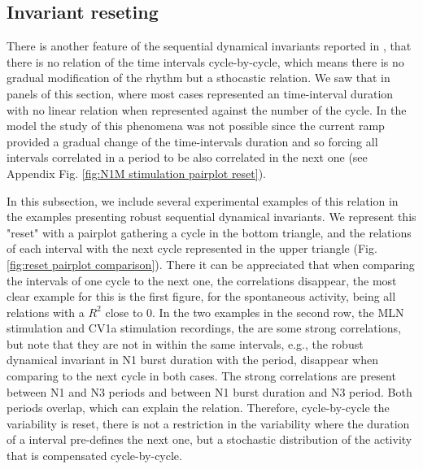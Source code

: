 \subsection{Invariant reseting}
There is another feature of the sequential dynamical invariants reported in \textcite{elices_robust_2019}, that there is no relation of the time intervals cycle-by-cycle, which means there is no gradual modification of the rhythm but a sthocastic relation. We saw that in panels of this section, where most cases represented an time-interval duration with no linear relation when represented against the number of the cycle. In the model the study of this phenomena was not possible since the current ramp provided a gradual change of the time-intervals duration and so forcing all intervals correlated in a period to be also correlated in the next one (see Appendix Fig. \ref{fig:N1M stimulation pairplot reset}). 

In this subsection, we include several experimental examples of this relation in the examples presenting robust sequential dynamical invariants. We represent this "reset" with a pairplot gathering a cycle in the bottom triangle, and the relations of each interval with the next cycle represented in the upper triangle (Fig. \ref{fig:reset pairplot comparison}). There it can be appreciated that when comparing the intervals of one cycle to the next one, the correlations disappear, the most clear example for this is the first figure, for the spontaneous activity, being all relations with a $R^2$ close to 0. In the two examples in the second row, the MLN stimulation and CV1a stimulation recordings, the are some strong correlations, but note that they are not in within the same intervals, e.g., the robust dynamical invariant in N1 burst duration with the period, disappear when comparing to the next cycle in both cases. The strong correlations are present between N1 and N3 periods and between N1 burst duration and N3 period. Both periods overlap, which can explain the relation. Therefore, cycle-by-cycle the variability is reset, there is not a restriction in the variability where the duration of a interval pre-defines the next one, but a stochastic distribution of the activity that is compensated cycle-by-cycle. 

